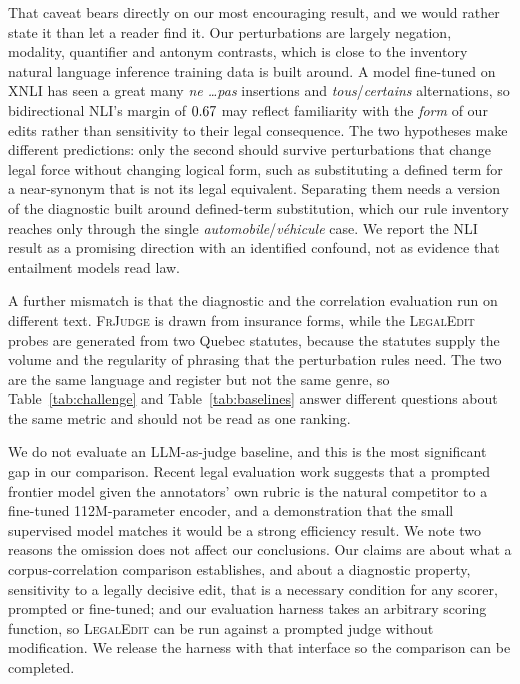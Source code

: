 \documentclass[11pt]{article}
\begin{document}
That caveat bears directly on our most encouraging result, and we would rather
state it than let a reader find it. Our perturbations are largely negation,
modality, quantifier and antonym contrasts, which is close to the inventory
natural language inference training data is built around. A model fine-tuned on
XNLI has seen a great many \emph{ne \dots pas} insertions and
\emph{tous}/\emph{certains} alternations, so bidirectional NLI's margin of
$0.67$ may reflect familiarity with the \emph{form} of our edits rather
than sensitivity to their legal consequence. The two hypotheses make different
predictions: only the second should survive perturbations that change legal
force without changing logical form, such as substituting a defined term for a
near-synonym that is not its legal equivalent. Separating them needs a version
of the diagnostic built around defined-term substitution, which our rule
inventory reaches only through the single \emph{automobile}/\emph{v\'ehicule}
case. We report the NLI result as a promising direction with an identified
confound, not as evidence that entailment models read law.

A further mismatch is that the diagnostic and the correlation evaluation run on
different text. \textsc{FrJudge} is drawn from insurance forms, while the
\textsc{LegalEdit} probes are generated from two Quebec statutes, because the
statutes supply the volume and the regularity of phrasing that the perturbation
rules need. The two are the same language and register but not the same genre,
so Table~\ref{tab:challenge} and Table~\ref{tab:baselines} answer different
questions about the same metric and should not be read as one ranking.

We do not evaluate an LLM-as-judge baseline, and this is the most significant
gap in our comparison. Recent legal evaluation work \citep{zhou2024lemaj}
suggests that a prompted frontier model given the annotators' own rubric is the
natural competitor to a fine-tuned 112M-parameter encoder, and a demonstration
that the small supervised model matches it would be a strong efficiency result.
We note two reasons the omission does not affect our conclusions. Our claims are
about what a corpus-correlation comparison establishes, and about a diagnostic
property, sensitivity to a legally decisive edit, that is a necessary condition
for any scorer, prompted or fine-tuned; and our evaluation harness
takes an arbitrary scoring function, so \textsc{LegalEdit} can be run against a
prompted judge without modification. We release the harness with that interface
so the comparison can be completed.
\end{document}
